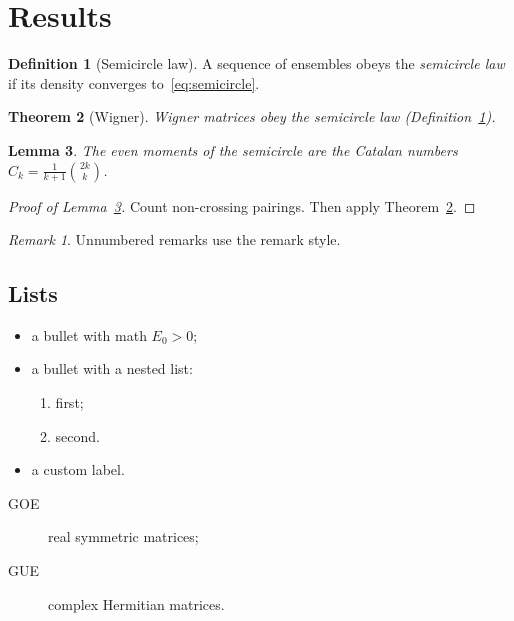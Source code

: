 \documentclass[11pt]{article}
\newtheorem{theorem}{Theorem}[section]
\newtheorem{lemma}[theorem]{Lemma}
\theoremstyle{definition}
\newtheorem{definition}[theorem]{Definition}
\theoremstyle{remark}
\newtheorem*{remark}{Remark}
\begin{document}
\section{Results}
\label{sec:results}

\begin{definition}[Semicircle law]
\label{def:sc}
A sequence of ensembles obeys the \emph{semicircle law} if its density converges to~\eqref{eq:semicircle}.
\end{definition}

\begin{theorem}[Wigner]
\label{thm:wigner}
Wigner matrices obey the semicircle law (Definition~\ref{def:sc}).
\end{theorem}

\begin{lemma}
\label{lem:moments}
The even moments of the semicircle are the Catalan numbers $C_k=\frac{1}{k+1}\binom{2k}{k}$.
\end{lemma}

\begin{proof}[Proof of Lemma~\ref{lem:moments}]
Count non-crossing pairings. Then apply Theorem~\ref{thm:wigner}.
\end{proof}

\begin{remark}
Unnumbered remarks use the remark style.
\end{remark}

\subsection{Lists}
\begin{itemize}
  \item a bullet with math $E_0>0$;
  \item a bullet with a nested list:
  \begin{enumerate}
    \item first;
    \item second.
  \end{enumerate}
  \item[$\star$] a custom label.
\end{itemize}
\begin{description}
  \item[GOE] real symmetric matrices;
  \item[GUE] complex Hermitian matrices.
\end{description}
\end{document}
